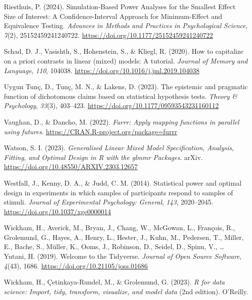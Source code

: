 \documentclass[
  man,
  floatsintext,
  longtable,
  a4paper,
  nolmodern,
  notxfonts,
  notimes,
  colorlinks=true,linkcolor=blue,citecolor=blue,urlcolor=blue]{apa7}
\newlength{\cslhangindent}
\newenvironment{CSLReferences}[2] %
 {\begin{list}{}{%
  \setlength{\itemindent}{0pt}
  \setlength{\leftmargin}{0pt}
  \setlength{\parsep}{0pt}
  \ifodd #1
   \setlength{\leftmargin}{\cslhangindent}
   \setlength{\itemindent}{-1\cslhangindent}
  \fi
  \setlength{\itemsep}{#2\baselineskip}}}
 {\end{list}}
\begin{document}
\begin{CSLReferences}{1}{0}
Riesthuis, P. (2024). Simulation-{Based Power Analyses} for the
{Smallest Effect Size} of {Interest}: {A Confidence-Interval Approach}
for {Minimum-Effect} and {Equivalence Testing}. \emph{Advances in
Methods and Practices in Psychological Science}, \emph{7}(2),
25152459241240722. \url{https://doi.org/10.1177/25152459241240722}

Schad, D. J., Vasishth, S., Hohenstein, S., \& Kliegl, R. (2020). How to
capitalize on a priori contrasts in linear (mixed) models: {A} tutorial.
\emph{Journal of Memory and Language}, \emph{110}, 104038.
\url{https://doi.org/10.1016/j.jml.2019.104038}

Uygun Tunç, D., Tunç, M. N., \& Lakens, D. (2023). The epistemic and
pragmatic function of dichotomous claims based on statistical hypothesis
tests. \emph{Theory \& Psychology}, \emph{33}(3), 403--423.
\url{https://doi.org/10.1177/09593543231160112}

Vaughan, D., \& Dancho, M. (2022). \emph{Furrr: Apply mapping functions
in parallel using futures}.
\url{https://CRAN.R-project.org/package=furrr}

Watson, S. I. (2023). \emph{Generalised {Linear Mixed Model
Specification}, {Analysis}, {Fitting}, and {Optimal Design} in {R} with
the glmmr {Packages}}. arXiv.
\url{https://doi.org/10.48550/ARXIV.2303.12657}

Westfall, J., Kenny, D. A., \& Judd, C. M. (2014). Statistical power and
optimal design in experiments in which samples of participants respond
to samples of stimuli. \emph{Journal of Experimental Psychology:
General}, \emph{143}, 2020--2045.
\url{https://doi.org/10.1037/xge0000014}

Wickham, H., Averick, M., Bryan, J., Chang, W., McGowan, L., François,
R., Grolemund, G., Hayes, A., Henry, L., Hester, J., Kuhn, M., Pedersen,
T., Miller, E., Bache, S., Müller, K., Ooms, J., Robinson, D., Seidel,
D., Spinu, V., \ldots{} Yutani, H. (2019). Welcome to the {Tidyverse}.
\emph{Journal of Open Source Software}, \emph{4}(43), 1686.
\url{https://doi.org/10.21105/joss.01686}

Wickham, H., Çetinkaya-Rundel, M., \& Grolemund, G. (2023). \emph{R for
data science: Import, tidy, transform, visualize, and model data} (2nd
edition). O'Reilly.


\end{CSLReferences}
\end{document}
